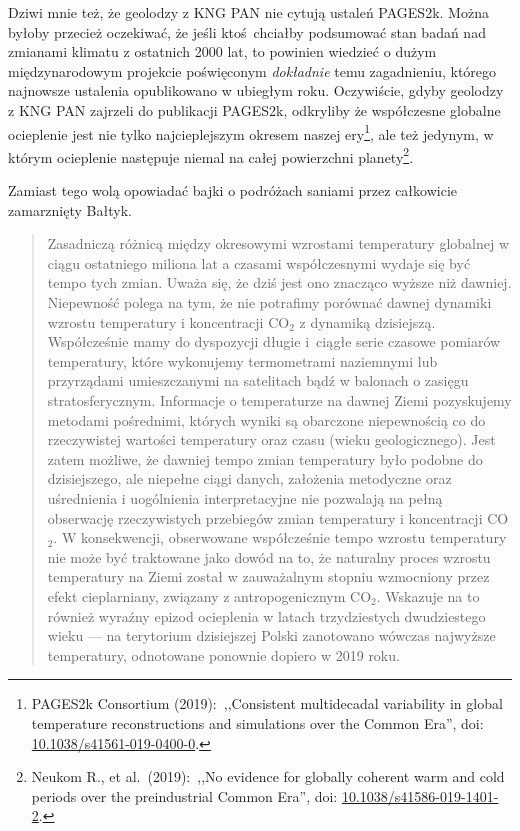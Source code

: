 \documentclass[12pt]{article}
\newcommand{\doi}[1]{doi: \href{htts://doi.org/#1}{#1}}
\begin{document}
Dziwi mnie też, że geolodzy z KNG PAN nie cytują ustaleń PAGES2k. Można byłoby przecież oczekiwać, że jeśli ktoś chciałby podsumować stan badań nad zmianami klimatu z ostatnich 2000 lat, to powinien wiedzieć o dużym międzynarodowym projekcie poświęconym \emph{dokładnie} temu zagadnieniu, którego najnowsze ustalenia opublikowano w ubiegłym roku. Oczywiście, gdyby geolodzy z KNG PAN zajrzeli do publikacji PAGES2k, odkryliby że współczesne globalne ocieplenie jest nie tylko najcieplejszym okresem naszej ery\footnote{PAGES2k Consortium (2019):~,,Consistent multidecadal variability in global temperature reconstructions and simulations over the Common Era'', \doi{10.1038/s41561-019-0400-0}.}, ale też jedynym, w którym ocieplenie następuje niemal na całej powierzchni planety\footnote{Neukom R., et al.~(2019):~,,No evidence for globally coherent warm and cold periods over the preindustrial Common Era'', \doi{10.1038/s41586-019-1401-2}.}.
		
Zamiast tego wolą opowiadać bajki o podróżach saniami przez całkowicie zamarznięty Bałtyk.

\begin{quotation}
	Zasadniczą różnicą między okresowymi wzrostami temperatury globalnej w ciągu ostatniego miliona lat a czasami współczesnymi wydaje się być tempo tych zmian. Uważa się, że dziś jest ono znacząco wyższe niż dawniej. Niepewność polega na tym, że nie potrafimy porównać dawnej dynamiki wzrostu temperatury i koncentracji CO$_2$ z dynamiką dzisiejszą. Współcześnie mamy do dyspozycji długie i~ciągłe serie czasowe pomiarów temperatury, które wykonujemy termometrami naziemnymi lub przyrządami umieszczanymi na satelitach bądź w balonach o zasięgu stratosferycznym. Informacje o temperaturze na dawnej Ziemi pozyskujemy metodami pośrednimi, których wyniki są obarczone niepewnością co do rzeczywistej wartości temperatury oraz czasu (wieku geologicznego). Jest zatem możliwe, że dawniej tempo zmian temperatury było podobne do dzisiejszego, ale niepełne ciągi danych, założenia metodyczne oraz uśrednienia i uogólnienia interpretacyjne nie pozwalają na pełną obserwację rzeczywistych przebiegów zmian temperatury i koncentracji CO$_2$. W konsekwencji, obserwowane współcześnie tempo wzrostu temperatury nie może być traktowane jako dowód na to, że naturalny proces wzrostu temperatury na Ziemi został w zauważalnym stopniu wzmocniony przez efekt cieplarniany, związany z antropogenicznym CO$_2$. Wskazuje na to również wyraźny epizod ocieplenia w latach trzydziestych dwudziestego wieku — na terytorium dzisiejszej Polski zanotowano wówczas najwyższe temperatury, odnotowane ponownie dopiero w 2019 roku.
\end{quotation}
\end{document}
